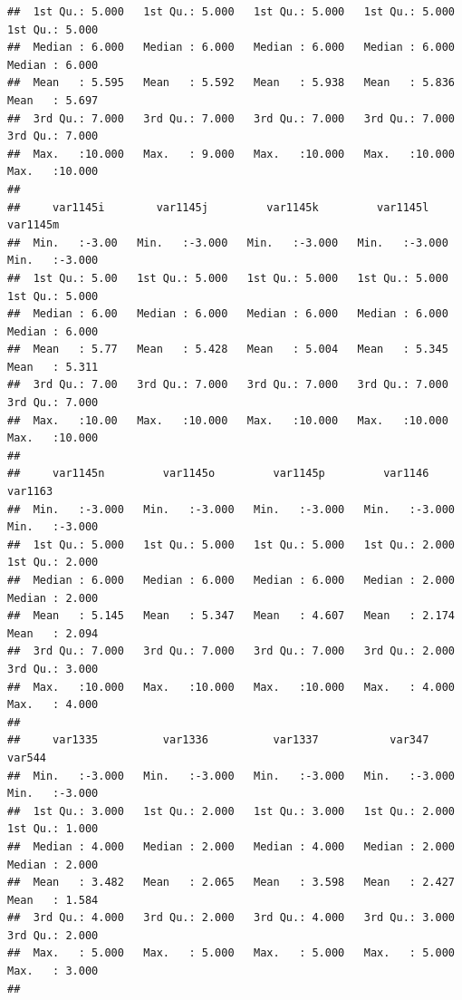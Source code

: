 \documentclass[
]{book}
\begin{document}
\begin{verbatim}
##  1st Qu.: 5.000   1st Qu.: 5.000   1st Qu.: 5.000   1st Qu.: 5.000   1st Qu.: 5.000  
##  Median : 6.000   Median : 6.000   Median : 6.000   Median : 6.000   Median : 6.000  
##  Mean   : 5.595   Mean   : 5.592   Mean   : 5.938   Mean   : 5.836   Mean   : 5.697  
##  3rd Qu.: 7.000   3rd Qu.: 7.000   3rd Qu.: 7.000   3rd Qu.: 7.000   3rd Qu.: 7.000  
##  Max.   :10.000   Max.   : 9.000   Max.   :10.000   Max.   :10.000   Max.   :10.000  
##                                                                                      
##     var1145i        var1145j         var1145k         var1145l         var1145m     
##  Min.   :-3.00   Min.   :-3.000   Min.   :-3.000   Min.   :-3.000   Min.   :-3.000  
##  1st Qu.: 5.00   1st Qu.: 5.000   1st Qu.: 5.000   1st Qu.: 5.000   1st Qu.: 5.000  
##  Median : 6.00   Median : 6.000   Median : 6.000   Median : 6.000   Median : 6.000  
##  Mean   : 5.77   Mean   : 5.428   Mean   : 5.004   Mean   : 5.345   Mean   : 5.311  
##  3rd Qu.: 7.00   3rd Qu.: 7.000   3rd Qu.: 7.000   3rd Qu.: 7.000   3rd Qu.: 7.000  
##  Max.   :10.00   Max.   :10.000   Max.   :10.000   Max.   :10.000   Max.   :10.000  
##                                                                                     
##     var1145n         var1145o         var1145p         var1146          var1163      
##  Min.   :-3.000   Min.   :-3.000   Min.   :-3.000   Min.   :-3.000   Min.   :-3.000  
##  1st Qu.: 5.000   1st Qu.: 5.000   1st Qu.: 5.000   1st Qu.: 2.000   1st Qu.: 2.000  
##  Median : 6.000   Median : 6.000   Median : 6.000   Median : 2.000   Median : 2.000  
##  Mean   : 5.145   Mean   : 5.347   Mean   : 4.607   Mean   : 2.174   Mean   : 2.094  
##  3rd Qu.: 7.000   3rd Qu.: 7.000   3rd Qu.: 7.000   3rd Qu.: 2.000   3rd Qu.: 3.000  
##  Max.   :10.000   Max.   :10.000   Max.   :10.000   Max.   : 4.000   Max.   : 4.000  
##                                                                                      
##     var1335          var1336          var1337           var347           var544      
##  Min.   :-3.000   Min.   :-3.000   Min.   :-3.000   Min.   :-3.000   Min.   :-3.000  
##  1st Qu.: 3.000   1st Qu.: 2.000   1st Qu.: 3.000   1st Qu.: 2.000   1st Qu.: 1.000  
##  Median : 4.000   Median : 2.000   Median : 4.000   Median : 2.000   Median : 2.000  
##  Mean   : 3.482   Mean   : 2.065   Mean   : 3.598   Mean   : 2.427   Mean   : 1.584  
##  3rd Qu.: 4.000   3rd Qu.: 2.000   3rd Qu.: 4.000   3rd Qu.: 3.000   3rd Qu.: 2.000  
##  Max.   : 5.000   Max.   : 5.000   Max.   : 5.000   Max.   : 5.000   Max.   : 3.000  
##                                                                                      

\end{verbatim}
\end{document}
